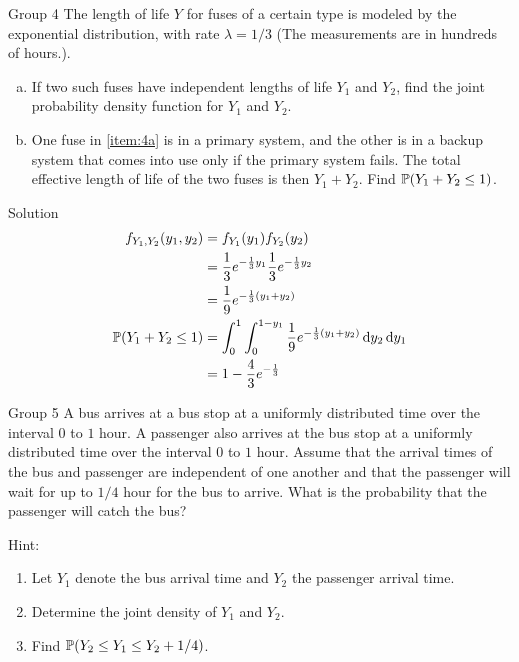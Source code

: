 \documentclass{article}
\begin{document}
\begin{problem}
    {Group 4}
    The length of life $Y$ for fuses of a certain type is modeled by the exponential distribution, with rate $\lambda=1/3$ (The measurements are in hundreds of hours.).
    \begin{enumerate}[(a)]
        \item If two such fuses have independent lengths of life $Y_1$ and $Y_2$, find the joint probability density function for $Y_1$ and $Y_2$.\label{item:4a}
        \item One fuse in \cref{item:4a} is in a primary system, and the other is in a backup system that comes into use only if the primary system fails. The total effective length of life of the two fuses is then $Y_1 + Y_2$. Find $\P{Y_1 + Y_2 \leq 1}$.
    \end{enumerate}
\end{problem}

\begin{solution}
    {Solution}
    \begin{align*}
        f_{Y_1,Y_2}(y_1,y_2)&= f_{Y_1}(y_1)f_{Y_2}(y_2) \\
        &= \frac{1}{3}e^{-\frac{1}{3}y_1}\frac{1}{3}e^{-\frac{1}{3}y_2} \\
        &= \frac{1}{9}e^{-\frac{1}{3}(y_1+y_2)} \\
        \P{Y_1+Y_2\leq 1} &= \int_{0}^{1}\int_{0}^{1-y_1}\frac{1}{9}e^{-\frac{1}{3}(y_1+y_2)}\diff y_2\diff y_1 \\
        &= 1-\frac{4}{3}e^{-\frac{1}{3}}
    \end{align*}
\end{solution}

\begin{problem}
    {Group 5}
    A bus arrives at a bus stop at a uniformly distributed time over the interval $0$ to $1$ hour. A passenger also arrives at the bus stop at a uniformly distributed time over the interval $0$ to $1$ hour. Assume that the arrival times of the bus and passenger are independent of one another and that the passenger will wait for up to $1/4$ hour for the bus to arrive. What is the probability that the passenger will catch the bus?
    \begin{solution}
        {Hint:}
        \begin{enumerate}
            \item Let $Y_1$ denote the bus arrival time and $Y_2$ the passenger arrival time.
            \item Determine the joint density of $Y_1$ and $Y_2$.
            \item Find $\P{Y_2 \leq Y_1 \leq Y_2 + 1/4}$.
        \end{enumerate}
    \end{solution}
\end{problem}
\end{document}
